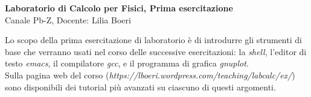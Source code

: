 \documentclass[11pt]{article}
\begin{document}
\pagestyle{empty}

\begin{center}
{\Large \bf  Laboratorio di Calcolo per Fisici, Prima esercitazione\\[2mm]}
{\large Canale Pb-Z, Docente: Lilia Boeri}
\end{center}
\vspace{4mm}

\begin{mdframed}[backgroundcolor=gray!10]
  Lo scopo della prima esercitazione di laboratorio \`e di introdurre gli strumenti di base che verranno usati nel corso delle successive esercitazioni:
  la {\em shell}, l'editor di testo {\em emacs}, il compilatore {\em gcc}, e il
  programma di grafica {\em gnuplot}.
\\
  Sulla pagina web del corso
  ({\em https://lboeri.wordpress.com/teaching/labcalc/ex/})
  sono disponibili dei tutorial pi\`u avanzati su ciascuno di questi argomenti.
\end{mdframed}
%
%
\end{document}
